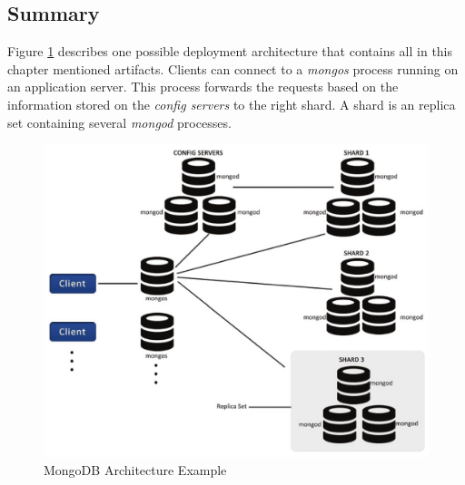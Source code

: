 \subsection{Summary}
Figure \ref{arch-example} describes one possible deployment architecture that contains all in this chapter mentioned artifacts. Clients can connect to a \textit{mongos} process running on an application server. This process forwards the requests based on the information stored on the \textit{config servers} to the right shard. A shard is an replica set containing several \textit{mongod} processes.
\begin{figure}[H]
\includegraphics[width=\linewidth,keepaspectratio]{images/deployment.png}
\caption{MongoDB Architecture Example}
\label{arch-example}
\end{figure}

